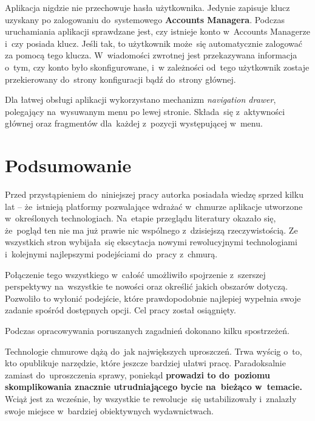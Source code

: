 \documentclass[12pt,a4paper,twoside,titlepage,openright]{book}
\begin{document}
Aplikacja nigdzie nie przechowuje hasła użytkownika. Jedynie zapisuje klucz uzyskany po zalogowaniu do~systemowego \textbf{Accounts Managera}. Podczas uruchamiania aplikacji sprawdzane jest, czy istnieje konto w~Accounts Managerze i~czy posiada klucz. Jeśli tak, to użytkownik może~się automatycznie zalogować za pomocą tego klucza. W~wiadomości zwrotnej jest przekazywana informacja o~tym, czy konto było skonfigurowane, i~w zależności od~tego użytkownik zostaje przekierowany do~strony konfiguracji bądź do~strony głównej.

Dla łatwej obsługi aplikacji wykorzystano mechanizm \textit{navigation drawer}, polegający na~wysuwanym menu po lewej stronie. Składa~się z~aktywności głównej oraz fragmentów dla~każdej z~pozycji występującej w~menu.


\chapter*{Podsumowanie}
 
Przed przystąpieniem do~niniejszej pracy autorka posiadała wiedzę sprzed kilku lat -- że~istnieją platformy pozwalające wdrażać w~chmurze aplikacje utworzone w~określonych technologiach. Na~etapie przeglądu literatury okazało się, że~pogląd ten nie ma już prawie nic wspólnego z~dzisiejszą rzeczywistością. Ze wszystkich stron wybijała~się ekscytacja nowymi rewolucyjnymi technologiami i~kolejnymi najlepszymi podejściami do~pracy z~chmurą. 

Połączenie tego wszystkiego w~całość umożliwiło spojrzenie z~szerszej perspektywy na~wszystkie te nowości oraz określić jakich obszarów dotyczą. Pozwoliło to wyłonić podejście, które prawdopodobnie najlepiej wypełnia swoje zadanie spośród dostępnych opcji. Cel pracy został osiągnięty.

Podczas opracowywania poruszanych zagadnień dokonano kilku spostrzeżeń.

Technologie chmurowe dążą do~jak największych uproszczeń. Trwa wyścig o~to, kto opublikuje narzędzie, które jeszcze bardziej ułatwi pracę. Paradoksalnie zamiast do~uproszczenia sprawy, poniekąd \textbf{prowadzi to do~poziomu skomplikowania znacznie utrudniającego bycie na~bieżąco w~temacie.} Wciąż jest za wcześnie, by wszystkie te rewolucje~się ustabilizowały i~znalazły swoje miejsce w~bardziej obiektywnych wydawnictwach. 
\end{document}
